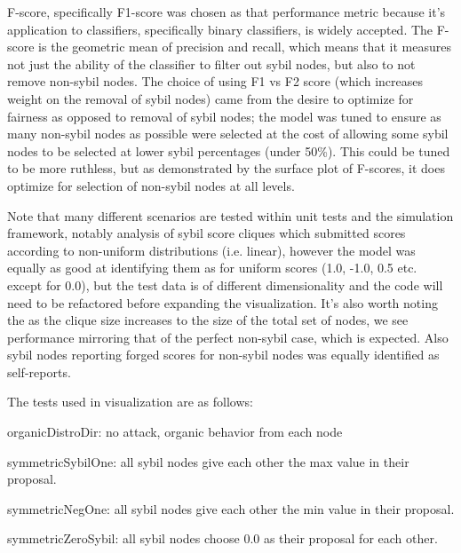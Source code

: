 \documentclass{article}
\begin{document}
F-score, specifically F1-score was chosen as that performance metric because it's application to classifiers, specifically binary classifiers, is widely accepted. The F-score is the geometric mean of precision and recall, which means that it measures not just the ability of the classifier to filter out sybil nodes, but also to not remove non-sybil nodes. The choice of using F1 vs F2 score (which increases weight on the removal of sybil nodes) came from the desire to optimize for fairness as opposed to removal of sybil nodes; the model was tuned to ensure as many non-sybil nodes as possible were selected at the cost of allowing some sybil nodes to be selected at lower sybil percentages (under 50\%). This could be tuned to be more ruthless, but as demonstrated by the surface plot of F-scores, it does optimize for selection of non-sybil nodes at all levels.

Note that many different scenarios are tested within unit tests and the simulation framework, notably analysis of sybil score cliques which submitted scores according to non-uniform distributions (i.e. linear), however the model was equally as good at identifying them as for uniform scores (1.0, -1.0, 0.5 etc. except for 0.0), but the test data is of different dimensionality and the code will need to be refactored before expanding the visualization. It's also worth noting the as the clique size increases to the size of the total set of nodes, we see performance mirroring that of the perfect non-sybil case, which is expected. Also sybil nodes reporting forged scores for non-sybil nodes was equally identified as self-reports.

The tests used in visualization are as follows:

organicDistroDir: no attack, organic behavior from each node

symmetricSybilOne: all sybil nodes give each other the max value in their proposal.

symmetricNegOne: all sybil nodes give each other the min value in their proposal.

symmetricZeroSybil: all sybil nodes choose 0.0 as their proposal for each other.
\end{document}
